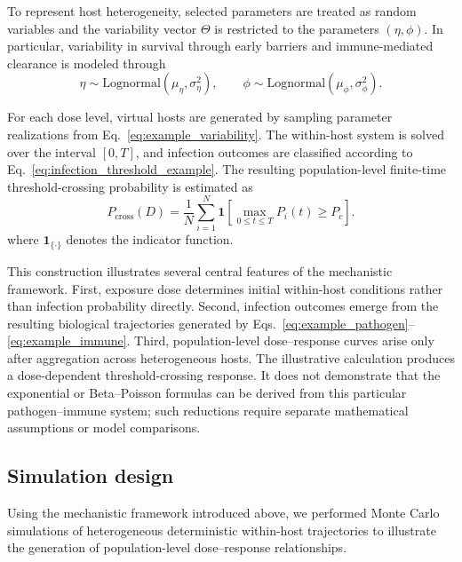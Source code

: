 \documentclass[11pt]{article}
\begin{document}
To represent host heterogeneity, selected parameters are treated as random variables and the variability vector $\Theta$ is restricted to the parameters $(\eta, \phi)$. In particular, variability in survival through early barriers and immune-mediated clearance is modeled through
\begin{equation}
\eta \sim \mathrm{Lognormal}(\mu_\eta,\sigma_\eta^2),
\qquad
\phi \sim \mathrm{Lognormal}(\mu_\phi,\sigma_\phi^2).
\label{eq:example_variability}
\end{equation}

For each dose level, virtual hosts are generated by sampling parameter
realizations from Eq.~\eqref{eq:example_variability}. The within-host
system is solved over the interval $[0,T]$, and infection outcomes are
classified according to Eq.~\eqref{eq:infection_threshold_example}. The resulting population-level finite-time threshold-crossing probability is estimated as
\begin{equation}
\widehat{P}_{\mathrm{cross}}(D)
=
\frac{1}{N}
\sum_{i=1}^N
\mathbf{1}
\left[
\max_{0\le t\le T} P_i(t)\ge P_c
\right].
\label{eq:estimated_dose_response}
\end{equation}
where $\mathbf{1}_{\{\cdot\}}$ denotes the indicator function.

This construction illustrates several central features of the mechanistic framework.
First, exposure dose determines initial within-host conditions rather than infection probability directly.
Second, infection outcomes emerge from the resulting biological trajectories generated by Eqs.~\eqref{eq:example_pathogen}--\eqref{eq:example_immune}.
Third, population-level dose--response curves arise only after aggregation across heterogeneous hosts.
The illustrative calculation produces a dose-dependent threshold-crossing response. It does not demonstrate that the exponential or Beta--Poisson formulas can be derived from this particular pathogen--immune system; such reductions require separate mathematical assumptions or model comparisons.

\subsection{Simulation design}


Using the mechanistic framework introduced above,
we performed Monte Carlo simulations of
heterogeneous deterministic within-host trajectories
to illustrate the generation of population-level
dose--response relationships.
\end{document}
